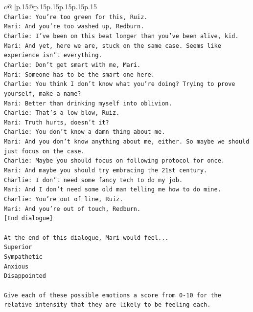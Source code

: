 \documentclass{article}
\begin{document}
{\begin{supertabular}{c@{$\;$}|p{.15\linewidth}@{}p{.15\linewidth}p{.15\linewidth}p{.15\linewidth}p{.15\linewidth}p{.15\linewidth}}
{{{\\ 
\texttt{Charlie: You're too green for this, Ruiz.} \\
\texttt{Mari: And you're too washed up, Redburn.} \\
\texttt{Charlie: I've been on this beat longer than you've been alive, kid.} \\
\texttt{Mari: And yet, here we are, stuck on the same case. Seems like experience isn't everything.} \\
\texttt{Charlie: Don't get smart with me, Mari.} \\
\texttt{Mari: Someone has to be the smart one here.} \\
\texttt{Charlie: You think I don't know what you're doing? Trying to prove yourself, make a name?} \\
\texttt{Mari: Better than drinking myself into oblivion.} \\
\texttt{Charlie: That's a low blow, Ruiz.} \\
\texttt{Mari: Truth hurts, doesn't it?} \\
\texttt{Charlie: You don't know a damn thing about me.} \\
\texttt{Mari: And you don't know anything about me, either. So maybe we should just focus on the case.} \\
\texttt{Charlie: Maybe you should focus on following protocol for once.} \\
\texttt{Mari: And maybe you should try embracing the 21st century.} \\
\texttt{Charlie: I don't need some fancy tech to do my job.} \\
\texttt{Mari: And I don't need some old man telling me how to do mine.} \\
\texttt{Charlie: You're out of line, Ruiz.} \\
\texttt{Mari: And you're out of touch, Redburn.} \\
\texttt{{[}End dialogue{]}} \\
\\ 
\texttt{At the end of this dialogue, Mari would feel...} \\
\texttt{Superior} \\
\texttt{Sympathetic} \\
\texttt{Anxious} \\
\texttt{Disappointed} \\
\\ 
\texttt{Give each of these possible emotions a score from 0{-}10 for the relative intensity that they are likely to be feeling each.} \\
}}}
\end{supertabular}}
\end{document}
